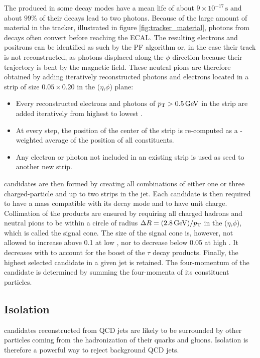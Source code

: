 The \pizero produced in some decay modes have a mean life of about $9 \times 10^{-17}\,\mathrm{s}$ and about $99\%$ of their decays lead to two photons. Because of the large amount of material in the tracker, illustrated in figure \ref{fig:tracker_material}, photons from \pizero decays often convert before reaching the ECAL. The resulting electrons and positrons can be identified as such by the PF algorithm or, in the case their track is not reconstructed, as photons displaced along the $\phi$ direction because their trajectory is bent by the magnetic field.
These neutral pions are therefore obtained by adding iteratively reconstructed photons and electrons located in a strip of size $0.05 \times 0.20$ in the ($\eta$,$\phi$) plane:
\begin{itemize}
    \item Every reconstructed electrons and photons of $p_{\mathrm{T}} > 0.5\,\mathrm{GeV}$ in the strip are added iteratively from highest to lowest \pt.
    \item At every step, the position of the center of the strip is re-computed as a \pt-weighted average of the position of all constituents.
    \item Any electron or photon not included in an existing strip is used as seed to another new strip.
\end{itemize}

\tauh candidates are then formed by creating all combinations of either one or three charged-particle and up to two strips in the jet.
Each \tauh candidate is then required to have a mass compatible with its decay mode and to have unit charge.
Collimation of the products are ensured by requiring all charged hadrons and neutral pions to be within a circle of radius $\Delta R = (2.8\,\mathrm{GeV})/p_{\mathrm{T}}$ in the ($\eta$,$\phi$), which is called the signal cone.
The size of the signal cone is, however, not allowed to increase above 0.1 at low \pt, nor to decrease below 0.05 at high \pt. It decreases with \pt to account for the boost of the $\tau$ decay products. Finally, the highest \pt selected \tauh candidate in a given jet is retained. The four-momentum of the \tauh candidate is determined by summing the four-momenta of its constituent particles.

\subsection{Isolation}


\tauh candidates reconstructed from QCD jets are likely to be surrounded by other particles coming from the hadronization of their quarks and gluons.
Isolation is therefore a powerful way to reject background QCD jets.

